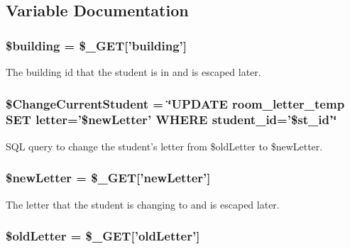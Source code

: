 \subsection{\-Variable \-Documentation}
\hypertarget{updateStudentLetter_8php_a903ab1c50249715a442ce81e6d5ba775}{
\subsubsection[{\$building}]{\setlength{\rightskip}{0pt plus 5cm}\$building = \$\-\_\-\-G\-E\-T\mbox{[}'building'\mbox{]}}}\label{updateStudentLetter_8php_a903ab1c50249715a442ce81e6d5ba775}
\-The building id that the student is in and is escaped later. \hypertarget{updateStudentLetter_8php_a5028b950af91c1e21a8e47bf6bd2f480}{
\subsubsection[{\$\-Change\-Current\-Student}]{\setlength{\rightskip}{0pt plus 5cm}\$\-Change\-Current\-Student = \char`\"{}\-U\-P\-D\-A\-T\-E room\-\_\-letter\-\_\-temp \-S\-E\-T letter='\$new\-Letter' \-W\-H\-E\-R\-E student\-\_\-id='\$st\-\_\-id'\char`\"{}}}\label{updateStudentLetter_8php_a5028b950af91c1e21a8e47bf6bd2f480}
\-S\-Q\-L query to change the student's letter from \$old\-Letter to \$new\-Letter. \hypertarget{updateStudentLetter_8php_ad5ac878e93fc1bef0c50e99e53515c4d}{
\subsubsection[{\$new\-Letter}]{\setlength{\rightskip}{0pt plus 5cm}\$new\-Letter = \$\-\_\-\-G\-E\-T\mbox{[}'new\-Letter'\mbox{]}}}\label{updateStudentLetter_8php_ad5ac878e93fc1bef0c50e99e53515c4d}
\-The letter that the student is changing to and is escaped later. \hypertarget{updateStudentLetter_8php_a41c33048ffcf05119d1162b4a317b806}{
\subsubsection[{\$old\-Letter}]{\setlength{\rightskip}{0pt plus 5cm}\$old\-Letter = \$\-\_\-\-G\-E\-T\mbox{[}'old\-Letter'\mbox{]}}}\label{updateStudentLetter_8php_a41c33048ffcf05119d1162b4a317b806}
